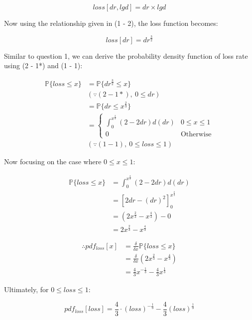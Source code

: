 \documentclass[11pt]{article}
\renewcommand{\P}{\mathbb{P}}
\begin{document}
\begin{equation} \tag{2 - 1}
loss[dr, lgd] = dr \times lgd
\end{equation}

Now using the relationship given in (1 - 2), the loss function
becomes:

\begin{equation} \tag{2 - 1*}
loss[dr] = dr^{\frac{3}{2}}
\end{equation}

Similar to question 1, we can derive the probability density function
of loss rate using (2 - 1*) and (1 - 1):

$$
\begin{aligned}
\P\{loss \leq x\} &=
\P\{dr^{\frac{3}{2}} \leq x\} \\
&(\because (2 - 1*), \ 0 \leq dr) \\
&= \P\{dr \leq x^{\frac{2}{3}}\} \\
&= \begin{cases} 
\int_0^{x^{\frac{2}{3}}} (2 - 2dr) d(dr) & 0 \leq x \leq 1 \\
0 & \text{Otherwise}
\end{cases}
\\
&(\because (1 - 1), \ 0 \leq loss \leq 1)
\end{aligned}
$$

Now focusing on the case where $0 \leq x \leq 1$:

$$
\begin{aligned}
\P\{loss \leq x\} &=
\int_0^{x^{\frac{2}{3}}} (2 - 2dr) d(dr) \\
&= \left[ 
2dr - (dr)^2
\right]_0^{x^{\frac{2}{3}}} \\
&= (2x^{\frac{2}{3}} - x^{\frac{4}{3}}) - 0 \\
&= 2x^{\frac{2}{3}} - x^{\frac{4}{3}}
\end{aligned}
$$

$$
\begin{aligned}
\therefore
pdf_{loss}[x] &= 
\frac{\delta}{\delta x} \P\{loss \leq x\} \\
&= \frac{\delta}{\delta x} (2x^{\frac{2}{3}} - x^{\frac{4}{3}}) \\
&= \frac{4}{3} x^{-\frac{1}{3}} - \frac{4}{3} x^{\frac{1}{3}}
\end{aligned}
$$

Ultimately, for $0 \leq loss \leq 1$:

\begin{equation} \tag{2 - 2}
pdf_{loss}[loss] =
\frac{4}{3} \cdot (loss)^{-\frac{1}{3}} 
-\frac{4}{3} (loss)^{\frac{1}{3}}
\end{equation}
\end{document}
